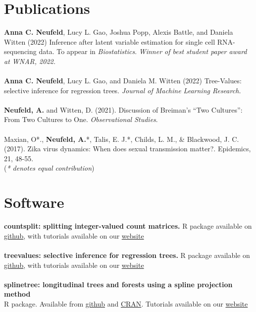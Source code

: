 \documentclass[margin, 10pt]{res} %
\begin{document}
\begin{resume}
{\section{Publications} 
\textbf{Anna C. Neufeld}, Lucy L. Gao, Joshua Popp, Alexis Battle, and Daniela Witten (2022) Inference after latent variable estimation for single cell RNA-sequencing data. To appear in \emph{Biostatistics}. \emph{Winner of best student paper award at WNAR, 2022.}  \\
\\
\textbf{Anna C. Neufeld}, Lucy L. Gao, and Daniela M. Witten (2022) Tree-Values: selective inference for regression trees. \emph{Journal of Machine Learning Research.}\\
\\
\textbf{Neufeld, A.} and Witten, D. (2021). Discussion of Breiman’s “Two Cultures”: From Two Cultures to One. \emph{Observational Studies}.  \\
\\
Maxian, O*., \textbf{Neufeld, A.}*, Talis, E. J.*, Childs, L. M., \& Blackwood, J. C. (2017). Zika virus dynamics: When does sexual transmission matter?. Epidemics, 21, 48-55. \\
\small
(\emph{* denotes equal contribution})
\normalsize


\section{Software} 
\textbf{countsplit: splitting integer-valued count matrices.} R package available on \href{https://github.com/anna-neufeld/countsplit}{github}, with tutorials available on our \href{https://anna-neufeld.github.io/countsplit/}{website} \\
\\
\textbf{treevalues: selective inference for regression trees.} R package available on \href{https://github.com/anna-neufeld/treevalues}{github}, with tutorials available on our \href{https://anna-neufeld.github.io/treevalues/articles/overview.html}{website} \\
\\
\textbf{splinetree: longitudinal trees and forests using a spline projection method} \\
R package. Available from \href{https://github.com/anna-neufeld/splinetree}{github} and \href{https://cran.r-project.org/web/packages/splinetree/index.html}{CRAN}. Tutorials available on our \href{https://anna-neufeld.github.io/splinetree/}{website}


}
\end{resume}
\end{document}
